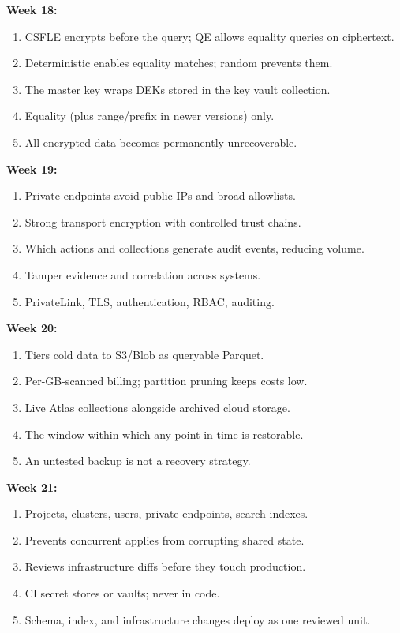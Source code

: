 \documentclass[11pt, a4paper]{article}
\begin{document}
\textbf{Week 18:}
\begin{enumerate}[itemsep=0pt]
    \item CSFLE encrypts before the query; QE allows equality queries on ciphertext.
    \item Deterministic enables equality matches; random prevents them.
    \item The master key wraps DEKs stored in the key vault collection.
    \item Equality (plus range/prefix in newer versions) only.
    \item All encrypted data becomes permanently unrecoverable.
\end{enumerate}

\textbf{Week 19:}
\begin{enumerate}[itemsep=0pt]
    \item Private endpoints avoid public IPs and broad allowlists.
    \item Strong transport encryption with controlled trust chains.
    \item Which actions and collections generate audit events, reducing volume.
    \item Tamper evidence and correlation across systems.
    \item PrivateLink, TLS, authentication, RBAC, auditing.
\end{enumerate}

\textbf{Week 20:}
\begin{enumerate}[itemsep=0pt]
    \item Tiers cold data to S3/Blob as queryable Parquet.
    \item Per-GB-scanned billing; partition pruning keeps costs low.
    \item Live Atlas collections alongside archived cloud storage.
    \item The window within which any point in time is restorable.
    \item An untested backup is not a recovery strategy.
\end{enumerate}

\textbf{Week 21:}
\begin{enumerate}[itemsep=0pt]
    \item Projects, clusters, users, private endpoints, search indexes.
    \item Prevents concurrent applies from corrupting shared state.
    \item Reviews infrastructure diffs before they touch production.
    \item CI secret stores or vaults; never in code.
    \item Schema, index, and infrastructure changes deploy as one reviewed unit.
\end{enumerate}
\end{document}
